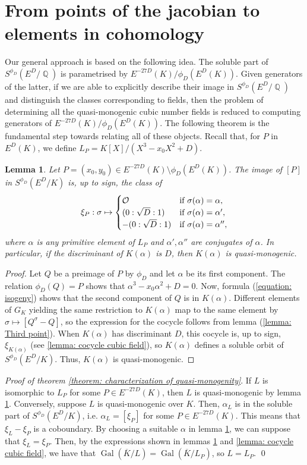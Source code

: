 \documentclass[oneside]{amsart}
\DeclareMathOperator{\QQ}{\mathbb{Q}}
\DeclareMathOperator{\gal}{Gal}
\newtheorem{lemma}[X]{Lemma}
\theoremstyle{definition}
\begin{document}
\section{From points of the jacobian to elements in cohomology}
\label{section: from points to orbits}
Our general approach is based on the following idea. The soluble part of $S^{\phi_D}(E^D/\QQ)$ is parametrised by $E^{-27D}(K)/\phi_D(E^D(K))$. Given generators of the latter, if we are able to explicitly describe their image in $S^{\phi_D}(E^D/\QQ)$ and distinguish the classes corresponding to fields, then the problem of determining all the quasi-monogenic cubic number fields is reduced to computing generators of $E^{-27D}(K)/\phi_D(E^D(K))$. The following theorem is the fundamental step towards relating all of these objects. Recall that, for $P$ in $E^D(K)$, we define $L_P = K[X]/(X^3 -x_0X^2 + D).$ 
\begin{lemma}
    \label{lemma: explicit cocycle}
    Let $P = (x_0,y_0) \in E^{-27D}(K) \setminus \phi_D(E^D(K))$. The image of $[P]$ in $S^{\phi_D}(E^D/K)$ is, up to sign, the class of
    $$
    \xi_P:\sigma \mapsto
    \begin{cases}
        \mathcal{O}&\textnormal{if }\sigma(\alpha) = \alpha,\\
        (0:\sqrt{D}:1)&\textnormal{if }\sigma(\alpha) = \alpha',\\
        -(0:\sqrt{D}:1)&\textnormal{if }\sigma(\alpha) = \alpha'',\\
    \end{cases}
    $$
    where $\alpha$ is any primitive element of $L_P$ and $\alpha', \alpha''$ are conjugates of $\alpha$. In particular, if the discriminant of $K(\alpha)$ is $D$, then $K(\alpha)$ is quasi-monogenic.
\end{lemma}
\begin{proof}
    Let $Q$ be a preimage of $P$ by $\phi_D$ and let $\alpha$ be its first component. The relation $\phi_D(Q) = P$ shows that $\alpha^3 - x_0\alpha^2 + D = 0$. Now, formula (\ref{equation: isogeny}) shows that the second component of $Q$ is in $K(\alpha)$. Different elements of $G_{K}$ yielding the same restriction to $K(\alpha)$ map to the same element by $\sigma \mapsto [Q^{\sigma} - Q]$, so the expression for the cocycle follows from lemma (\ref{lemma: Third point}). When $K(\alpha)$ has discriminant $D$, this cocycle is, up to sign, $\xi_{K(\alpha)}$ (see \ref{lemma: cocycle cubic field}), so $K(\alpha)$ defines a soluble orbit of $S^{\phi_D}(E^D/K)$. Thus, $K(\alpha)$ is quasi-monogenic.
\end{proof}
\textit{Proof of theorem \ref{theorem: characterization of quasi-monogenity}}. If $L$ is isomorphic to $L_P$ for some $P \in E^{-27D}(K)$, then $L$ is quasi-monogenic by lemma \ref{lemma: explicit cocycle}. Conversely, suppose $L$ is quasi-monogenic over $K$. Then, $\alpha_L$ is in the soluble part of $S^{\phi_D}(E^D/K)$, i.e. $\alpha_L = [\xi_P]$ for some $P \in E^{-27D}(K)$. This means that $\xi_L - \xi_P$ is a coboundary. By choosing a suitable $\alpha$ in lemma \ref{lemma: explicit cocycle}, we can suppose that $\xi_L = \xi_P$. Then, by the expressions shown in lemmas \ref{lemma: explicit cocycle} and \ref{lemma: cocycle cubic field}, we have that $\gal(\overline{K}/L) = \gal(\overline{K}/L_P)$, so $L = L_P$. \qed
\end{document}

